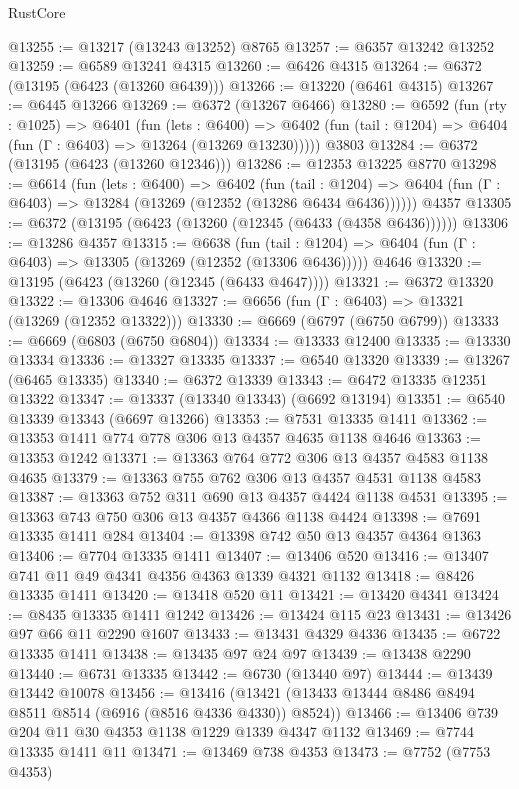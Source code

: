 \begin{lexlean}{RustCore}
\begin{coremodule}
@13255 := @13217 (@13243 @13252) @8765
@13257 := @6357 @13242 @13252
@13259 := @6589 @13241 @4315
@13260 := @6426 @4315
@13264 := @6372 (@13195 (@6423 (@13260 @6439)))
@13266 := @13220 (@6461 @4315)
@13267 := @6445 @13266
@13269 := @6372 (@13267 @6466)
@13280 := @6592
    (fun (rty : @1025) =>
    @6401
      (fun (lets : @6400) =>
      @6402 (fun (tail : @1204) => @6404 (fun (Γ : @6403) => @13264 (@13269 @13230)))))
    @3803
@13284 := @6372 (@13195 (@6423 (@13260 @12346)))
@13286 := @12353 @13225 @8770
@13298 := @6614
    (fun (lets : @6400) =>
    @6402
      (fun (tail : @1204) =>
      @6404 (fun (Γ : @6403) => @13284 (@13269 (@12352 (@13286 @6434 @6436))))))
    @4357
@13305 := @6372 (@13195 (@6423 (@13260 (@12345 (@6433 (@4358 @6436))))))
@13306 := @13286 @4357
@13315 := @6638
    (fun (tail : @1204) => @6404 (fun (Γ : @6403) => @13305 (@13269 (@12352 (@13306 @6436)))))
    @4646
@13320 := @13195 (@6423 (@13260 (@12345 (@6433 @4647))))
@13321 := @6372 @13320
@13322 := @13306 @4646
@13327 := @6656 (fun (Γ : @6403) => @13321 (@13269 (@12352 @13322)))
@13330 := @6669 (@6797 (@6750 @6799))
@13333 := @6669 (@6803 (@6750 @6804))
@13334 := @13333 @12400
@13335 := @13330 @13334
@13336 := @13327 @13335
@13337 := @6540 @13320
@13339 := @13267 (@6465 @13335)
@13340 := @6372 @13339
@13343 := @6472 @13335 @12351 @13322
@13347 := @13337 (@13340 @13343) (@6692 @13194)
@13351 := @6540 @13339 @13343 (@6697 @13266)
@13353 := @7531 @13335 @1411
@13362 := @13353 @1411 @774 @778 @306 @13 @4357 @4635 @1138 @4646
@13363 := @13353 @1242
@13371 := @13363 @764 @772 @306 @13 @4357 @4583 @1138 @4635
@13379 := @13363 @755 @762 @306 @13 @4357 @4531 @1138 @4583
@13387 := @13363 @752 @311 @690 @13 @4357 @4424 @1138 @4531
@13395 := @13363 @743 @750 @306 @13 @4357 @4366 @1138 @4424
@13398 := @7691 @13335 @1411 @284
@13404 := @13398 @742 @50 @13 @4357 @4364 @1363
@13406 := @7704 @13335 @1411
@13407 := @13406 @520
@13416 := @13407 @741 @11 @49 @4341 @4356 @4363 @1339 @4321 @1132
@13418 := @8426 @13335 @1411
@13420 := @13418 @520 @11
@13421 := @13420 @4341
@13424 := @8435 @13335 @1411 @1242
@13426 := @13424 @115 @23
@13431 := @13426 @97 @66 @11 @2290 @1607
@13433 := @13431 @4329 @4336
@13435 := @6722 @13335 @1411
@13438 := @13435 @97 @24 @97
@13439 := @13438 @2290
@13440 := @6731 @13335
@13442 := @6730 (@13440 @97)
@13444 := @13439 @13442 @10078
@13456 := @13416 (@13421 (@13433 @13444 @8486 @8494 @8511 @8514 (@6916 (@8516 @4336 @4330)) @8524))
@13466 := @13406 @739 @204 @11 @30 @4353 @1138 @1229 @1339 @4347 @1132
@13469 := @7744 @13335 @1411 @11
@13471 := @13469 @738 @4353
@13473 := @7752 (@7753 @4353)

\end{coremodule}
\end{lexlean}
